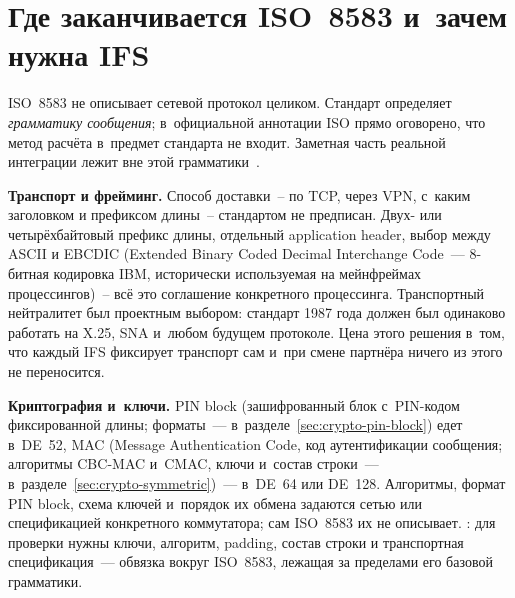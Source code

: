 \section{Где заканчивается ISO~8583 и~зачем нужна IFS}\label{sec:iso8583-implementations}

ISO~8583 не описывает сетевой протокол целиком. Стандарт определяет \emph{грамматику сообщения}; в~официальной аннотации ISO прямо оговорено, что метод расчёта в~предмет стандарта не входит.
Заметная часть реальной интеграции лежит вне этой грамматики~\cite{iso-8583-2023,fis-iso8583-guide-2023}.

\textbf{Транспорт и фрейминг.} Способ доставки~-- по TCP, через VPN, с~каким заголовком и префиксом длины~-- стандартом не предписан. Двух- или четырёхбайтовый префикс длины, отдельный application header, выбор между ASCII и EBCDIC (Extended Binary Coded Decimal Interchange Code~--- 8-битная кодировка IBM, исторически используемая на мейнфреймах процессингов)~-- всё это соглашение конкретного процессинга.
Транспортный нейтралитет был проектным выбором: стандарт 1987 года должен был одинаково работать на X.25, SNA и~любом будущем протоколе. Цена этого решения в~том, что каждый IFS фиксирует транспорт сам и~при смене партнёра ничего из этого не переносится.

\textbf{Криптография и~ключи.} PIN block (зашифрованный блок с~PIN-кодом фиксированной длины; форматы~--- в~разделе~\ref{sec:crypto-pin-block}) едет в~DE~52, MAC (Message Authentication Code, код аутентификации сообщения; алгоритмы CBC-MAC и~CMAC, ключи и~состав строки~--- в~разделе~\ref{sec:crypto-symmetric})~--- в~DE~64 или DE~128. Алгоритмы, формат PIN block, схема ключей и~порядок их обмена задаются сетью или спецификацией конкретного коммутатора; сам ISO~8583 их не описывает.
: для проверки
нужны ключи, алгоритм, padding, состав строки и транспортная
спецификация~--- обвязка вокруг ISO~8583, лежащая за пределами его
базовой грамматики.

